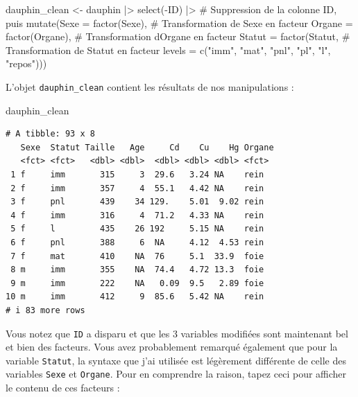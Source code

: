 \documentclass[
  a4paper,
  DIV=11,
  numbers=noendperiod,
  oneside]{scrreprt}
\newenvironment{Shaded}{}{}
\newcommand{\AttributeTok}[1]{\textcolor[rgb]{0.84,0.23,0.29}{#1}}
\newcommand{\CommentTok}[1]{\textcolor[rgb]{0.42,0.45,0.49}{#1}}
\newcommand{\FunctionTok}[1]{\textcolor[rgb]{0.44,0.26,0.76}{#1}}
\newcommand{\NormalTok}[1]{\textcolor[rgb]{0.14,0.16,0.18}{#1}}
\newcommand{\OtherTok}[1]{\textcolor[rgb]{0.44,0.26,0.76}{#1}}
\newcommand{\SpecialCharTok}[1]{\textcolor[rgb]{0.00,0.36,0.77}{#1}}
\newcommand{\StringTok}[1]{\textcolor[rgb]{0.01,0.18,0.38}{#1}}
\begin{document}
\begin{Shaded}
\begin{Highlighting}[]
\NormalTok{dauphin\_clean }\OtherTok{\textless{}{-}}\NormalTok{ dauphin }\SpecialCharTok{|\textgreater{}} 
  \FunctionTok{select}\NormalTok{(}\SpecialCharTok{{-}}\NormalTok{ID) }\SpecialCharTok{|\textgreater{}}                 \CommentTok{\# Suppression de la colonne ID, puis}
  \FunctionTok{mutate}\NormalTok{(}\AttributeTok{Sexe =} \FunctionTok{factor}\NormalTok{(Sexe),     }\CommentTok{\# Transformation de Sexe en facteur}
         \AttributeTok{Organe =} \FunctionTok{factor}\NormalTok{(Organe), }\CommentTok{\# Transformation d\textquotesingle{}Organe en facteur}
         \AttributeTok{Statut =} \FunctionTok{factor}\NormalTok{(Statut,  }\CommentTok{\# Transformation de Statut en facteur}
                         \AttributeTok{levels =} \FunctionTok{c}\NormalTok{(}\StringTok{"imm"}\NormalTok{, }\StringTok{"mat"}\NormalTok{, }\StringTok{"pnl"}\NormalTok{, }\StringTok{"pl"}\NormalTok{, }\StringTok{"l"}\NormalTok{, }\StringTok{"repos"}\NormalTok{)))}
\end{Highlighting}
\end{Shaded}

L'objet \texttt{dauphin\_clean} contient les résultats de nos
manipulations :

\begin{Shaded}
\begin{Highlighting}[]
\NormalTok{dauphin\_clean}
\end{Highlighting}
\end{Shaded}

\begin{verbatim}
# A tibble: 93 x 8
   Sexe  Statut Taille   Age     Cd    Cu    Hg Organe
   <fct> <fct>   <dbl> <dbl>  <dbl> <dbl> <dbl> <fct> 
 1 f     imm       315     3  29.6   3.24 NA    rein  
 2 f     imm       357     4  55.1   4.42 NA    rein  
 3 f     pnl       439    34 129.    5.01  9.02 rein  
 4 f     imm       316     4  71.2   4.33 NA    rein  
 5 f     l         435    26 192     5.15 NA    rein  
 6 f     pnl       388     6  NA     4.12  4.53 rein  
 7 f     mat       410    NA  76     5.1  33.9  foie  
 8 m     imm       355    NA  74.4   4.72 13.3  foie  
 9 m     imm       222    NA   0.09  9.5   2.89 foie  
10 m     imm       412     9  85.6   5.42 NA    rein  
# i 83 more rows
\end{verbatim}

Vous notez que \texttt{ID} a disparu et que les 3 variables modifiées
sont maintenant bel et bien des facteurs. Vous avez probablement
remarqué également que pour la variable \texttt{Statut}, la syntaxe que
j'ai utilisée est légèrement différente de celle des variables
\texttt{Sexe} et \texttt{Organe}. Pour en comprendre la raison, tapez
ceci pour afficher le contenu de ces facteurs :
\end{document}
